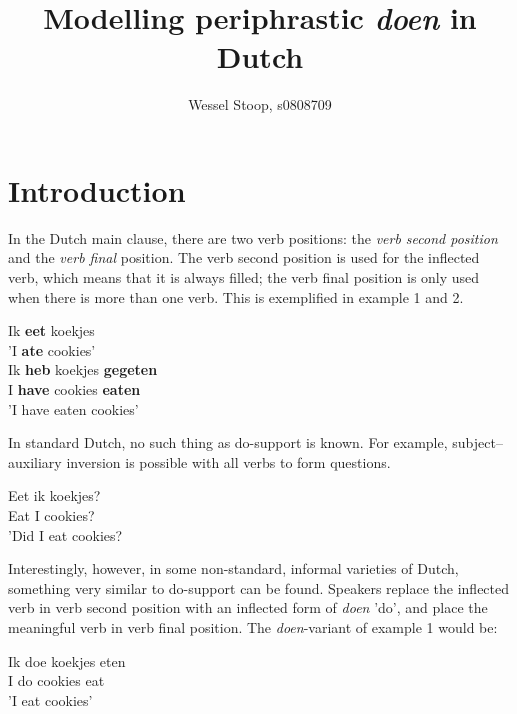 \documentclass[12pt]{article}
\title{Modelling periphrastic \emph{doen} in Dutch}
\author{Wessel Stoop, s0808709}
\begin{document}
\maketitle

\section{Introduction}
In the Dutch main clause, there are two verb positions: the \emph{verb second position} and the \emph{verb final} position. The verb second position is used for the inflected verb, which means that it is always filled; the verb final position is only used when there is more than one verb. This is exemplified in example 1 and 2.

\begin{exe}
\ex \gll Ik \textbf{eet} koekjes\\
 'I \textbf{ate} cookies'\\

\ex \gll Ik \textbf{heb} koekjes \textbf{gegeten}\\
I \textbf{have} cookies \textbf{eaten}\\
\trans 'I have eaten cookies'
\end{exe}

In standard Dutch, no such thing as do-support is known. For example, subject–auxiliary inversion is possible with all verbs to form questions.

\begin{exe}
\ex \gll Eet ik koekjes? \\
Eat I cookies? \\
\trans 'Did I eat cookies?
\end{exe}

Interestingly, however, in some non-standard, informal varieties of Dutch, something very similar to do-support can be found. Speakers replace the inflected verb in verb second position with an inflected form of \emph{doen} 'do', and place the meaningful verb in verb final position. The \emph{doen}-variant of example 1 would be:

\begin{exe}
\ex \gll Ik doe koekjes eten \\
I do cookies eat\\
\trans 'I eat cookies'
\end{exe}
\end{document}
